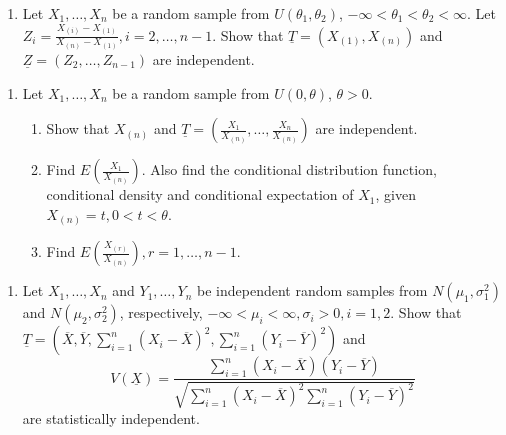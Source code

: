 \documentclass[11pt]{article}
\begin{document}
\vspace{1em}

\begin{enumerate}
    \item[3.] Let $X_1, \dots, X_n$ be a random sample from $U(\theta_1, \theta_2)$, $-\infty < \theta_1 < \theta_2 < \infty$. Let $Z_i = \frac{X_{(i)} - X_{(1)}}{X_{(n)} - X_{(1)}}, i = 2, \dots, n-1$. Show that $\underline{T} = (X_{(1)}, X_{(n)})$ and $\underline{Z} = (Z_2, \dots, Z_{n-1})$ are independent.
\end{enumerate}

\vspace{1em}

\begin{enumerate}
    \item[4.] Let $X_1, \dots, X_n$ be a random sample from $U(0, \theta)$, $\theta > 0$.
    \begin{enumerate}
        \item[(i)] Show that $X_{(n)}$ and $\underline{T} = (\frac{X_1}{X_{(n)}}, \dots, \frac{X_n}{X_{(n)}})$ are independent.
        \item[(ii)] Find $E(\frac{X_1}{X_{(n)}})$. Also find the conditional distribution function, conditional density and conditional expectation of $X_1$, given $X_{(n)} = t, 0 < t < \theta$.
        \item[(iii)] Find $E(\frac{X_{(r)}}{X_{(n)}}), r = 1, \dots, n-1$.
    \end{enumerate}
\end{enumerate}

\vspace{1em}

\begin{enumerate}
    \item[5.] Let $X_1, \dots, X_n$ and $Y_1, \dots, Y_n$ be independent random samples from $N(\mu_1, \sigma_1^2)$ and $N(\mu_2, \sigma_2^2)$, respectively, $-\infty < \mu_i < \infty, \sigma_i > 0, i = 1, 2$. Show that $\underline{T} = (\overline{X}, \overline{Y}, \sum_{i=1}^n (X_i - \overline{X})^2, \sum_{i=1}^n (Y_i - \overline{Y})^2)$ and
    $$V(\underline{X}) = \frac{\sum_{i=1}^n (X_i - \overline{X})(Y_i - \overline{Y})}{\sqrt{\sum_{i=1}^n (X_i - \overline{X})^2 \sum_{i=1}^n (Y_i - \overline{Y})^2}}$$
    are statistically independent.
\end{enumerate}
\end{document}
